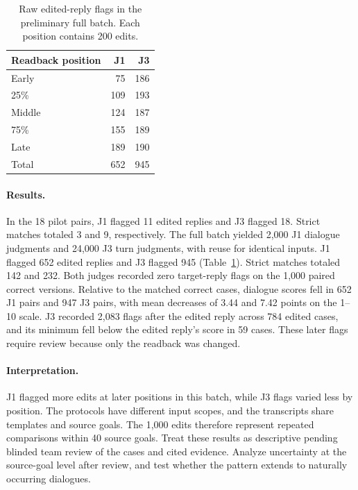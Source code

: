 \begin{table}[t]
  \centering
  \begin{tabular}{lrr}
    \toprule
    Readback position & J1 & J3 \\
    \midrule
    Early & 75 & 186 \\
    25\% & 109 & 193 \\
    Middle & 124 & 187 \\
    75\% & 155 & 189 \\
    Late & 189 & 190 \\
    \midrule
    Total & 652 & 945 \\
    \bottomrule
  \end{tabular}
  \caption{Raw edited-reply flags in the preliminary full batch. Each position contains 200 edits.}
  \label{tab:overnight-flags}
\end{table}

\paragraph{Results.}
In the 18 pilot pairs, J1 flagged 11 edited replies and J3 flagged 18. Strict matches totaled 3 and 9, respectively. The full batch yielded 2,000 J1 dialogue judgments and 24,000 J3 turn judgments, with reuse for identical inputs. J1 flagged 652 edited replies and J3 flagged 945 (Table~\ref{tab:overnight-flags}). Strict matches totaled 142 and 232. Both judges recorded zero target-reply flags on the 1,000 paired correct versions. Relative to the matched correct cases, dialogue scores fell in 652 J1 pairs and 947 J3 pairs, with mean decreases of 3.44 and 7.42 points on the 1--10 scale. J3 recorded 2,083 flags after the edited reply across 784 edited cases, and its minimum fell below the edited reply's score in 59 cases. These later flags require review because only the readback was changed.

\paragraph{Interpretation.}
J1 flagged more edits at later positions in this batch, while J3 flags varied less by position. The protocols have different input scopes, and the transcripts share templates and source goals. The 1,000 edits therefore represent repeated comparisons within 40 source goals. Treat these results as descriptive pending blinded team review of the cases and cited evidence. Analyze uncertainty at the source-goal level after review, and test whether the pattern extends to naturally occurring dialogues.
